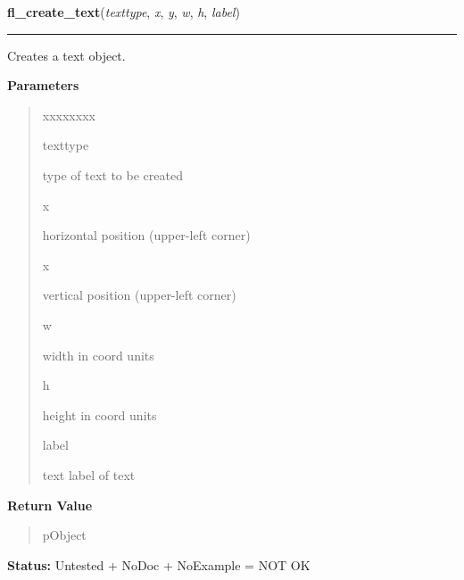 \hspace{.8\funcindent}\begin{boxedminipage}{\funcwidth}

    \raggedright \textbf{fl\_create\_text}(\textit{texttype}, \textit{x}, \textit{y}, \textit{w}, \textit{h}, \textit{label})

    \vspace{-1.5ex}

    \rule{\textwidth}{0.5\fboxrule}
\setlength{\parskip}{2ex}
    Creates a text object.

\setlength{\parskip}{1ex}
      \textbf{Parameters}
      \vspace{-1ex}

      \begin{quote}
        \begin{Ventry}{xxxxxxxx}

          \item[texttype]

          type of text to be created

          \item[x]

          horizontal position (upper-left corner)

          \item[x]

          vertical position (upper-left corner)

          \item[w]

          width in coord units

          \item[h]

          height in coord units

          \item[label]

          text label of text

        \end{Ventry}

      \end{quote}

      \textbf{Return Value}
    \vspace{-1ex}

      \begin{quote}
      pObject

      \end{quote}

\textbf{Status:} Untested + NoDoc + NoExample = NOT OK



    \end{boxedminipage}

